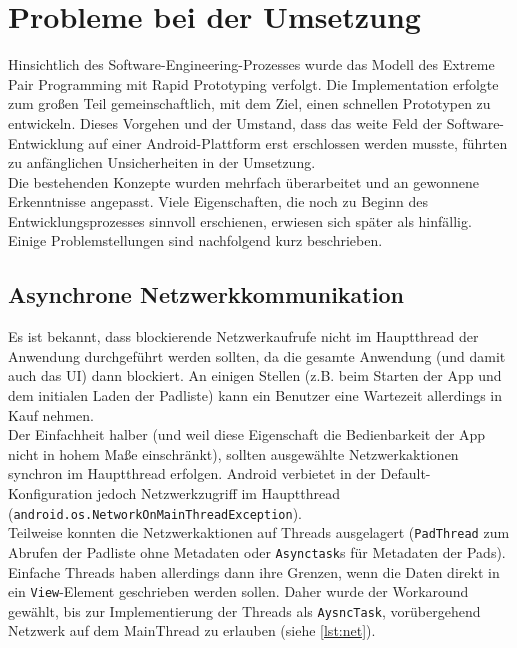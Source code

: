 \newpage
\section{Probleme bei der Umsetzung}
Hinsichtlich des Software-Engineering-Prozesses wurde das Modell des Extreme Pair Programming mit Rapid Prototyping verfolgt.
Die Implementation erfolgte zum großen Teil gemeinschaftlich, mit dem Ziel, einen schnellen Prototypen zu entwickeln.
Dieses Vorgehen und der Umstand, dass das weite Feld der Software-Entwicklung auf einer Android-Plattform erst erschlossen werden musste, führten zu anfänglichen Unsicherheiten in der Umsetzung.\\
Die bestehenden Konzepte wurden mehrfach überarbeitet und an gewonnene Erkenntnisse angepasst.
Viele Eigenschaften, die noch zu Beginn des Entwicklungsprozesses sinnvoll erschienen, erwiesen sich später als hinfällig.\\
Einige Problemstellungen sind nachfolgend kurz beschrieben.

\subsection{Asynchrone Netzwerkkommunikation}
Es ist bekannt, dass blockierende Netzwerkaufrufe nicht im Hauptthread der Anwendung durchgeführt werden sollten, da die gesamte Anwendung (und damit auch das UI) dann blockiert.
An einigen Stellen (z.B. beim Starten der App und dem initialen Laden der Padliste) kann ein Benutzer eine Wartezeit allerdings in Kauf nehmen.\\
Der Einfachheit halber (und weil diese Eigenschaft die Bedienbarkeit der App nicht in hohem Maße einschränkt), sollten ausgewählte Netzwerkaktionen synchron im Hauptthread erfolgen.
Android verbietet in der Default-Konfiguration jedoch Netzwerkzugriff im Hauptthread (\texttt{android.os.NetworkOnMainThreadException}).\\
Teilweise konnten die Netzwerkaktionen auf Threads ausgelagert (\texttt{PadThread} zum Abrufen der Padliste ohne Metadaten oder \texttt{Asynctask}s für Metadaten der Pads).
Einfache Threads haben allerdings dann ihre Grenzen, wenn die Daten direkt in ein \texttt{View}-Element geschrieben werden sollen.
Daher wurde der Workaround gewählt, bis zur Implementierung der Threads als \texttt{AysncTask}, vorübergehend Netzwerk auf dem MainThread zu erlauben (siehe \autoref{lst:net}).
\\[1em]


